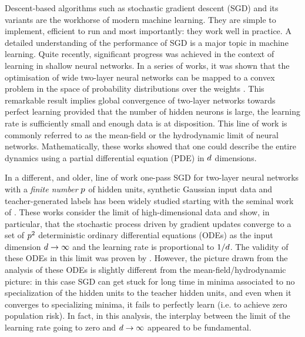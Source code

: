 \documentclass[10pt]{article}
\begin{document}
Descent-based algorithms such as stochastic gradient descent (SGD) and its variants are the workhorse of modern machine learning. They are simple to implement, efficient to run and most importantly: they work well in practice. %
A detailed understanding of the performance of SGD is a major topic in machine learning.
Quite recently, significant progress was achieved in the context of learning in shallow neural networks. In a series of works, it was shown that the optimisation of wide two-layer neural networks can be mapped to a convex problem in the space of probability distributions over the weights  \cite{mei_2018,chizat_2018,rotskoff_2019,sirignano2020mean}. This remarkable result implies global convergence of two-layer networks towards perfect learning provided that the number of hidden neurons is large, the learning rate is sufficiently small and enough data is at disposition. This line of work is commonly referred to as the mean-field or the hydrodynamic limit of neural networks. Mathematically, these works showed that one could describe the entire dynamics
using a partial differential equation (PDE) in $d$ dimensions.

In a different, and older, line of work one-pass SGD for two-layer neural networks with a {\it finite number} $p$ of hidden units, synthetic Gaussian input data and teacher-generated labels has been widely studied starting with the seminal work of \cite{saad_1995}. These works consider the limit of high-dimensional data and show, in particular, that the stochastic process driven by gradient updates converge to a set of $p^2$ deterministic ordinary differential equations (ODEs) as the input dimension $d\to\infty$ and the learning rate is proportional to $1/ d$. The validity of these ODEs in this limit was proven by \cite{goldt_2019}. However, the picture drawn from the analysis of these ODEs is slightly different from the mean-field/hydrodynamic picture: in this case SGD can get stuck for long time in minima associated to no specialization of the hidden units to the teacher hidden units, and even when it converges to specializing minima, it fails to perfectly learn (i.e. to achieve zero population risk). In fact, in this analysis, the interplay between the limit of the learning rate going to zero and $d \to \infty$ appeared to be fundamental. 
\end{document}
